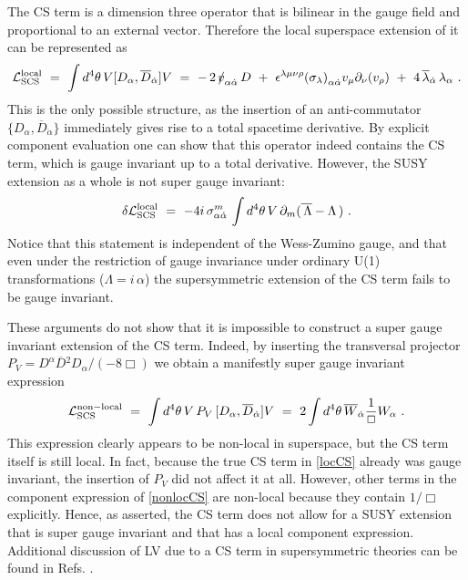 \documentclass[12pt]{revtex4}
\newcommand{\slashed}[1]{\hbox{{$#1$}\llap{$/$}}}
\begin{document}
The CS term is
a dimension three operator that is bilinear in the gauge field and
proportional to an external vector. 
Therefore the local superspace
extension of it can be represented as 
%
\begin{equation}
{\cal L}_{\rm SCS}^{\rm local} ~=~ \int d^4 \theta \, 
V [ D_\alpha, \overline{D}_{\dot\alpha}] V 
	~=~
	-\, 2\,\slashed{v}_{\alpha\dot{\alpha}}\, D
	~+~ 
	\epsilon^{\lambda\mu\nu\rho} 
	{(\sigma_{\lambda})}_{\alpha\dot{\alpha}} 
	v_\mu \partial_\nu ( v_\rho )
	~+~
	4\, \overline{\lambda}_{\dot{\alpha}}\, \lambda_\alpha ~. 
\label{locCS}
\end{equation} 
%
This is the only possible structure, as the insertion of an anti-commutator 
$\{D_\alpha, \overline{D}_{\dot\alpha}\}$ immediately gives rise to a total spacetime
derivative. By explicit component evaluation one can
show that this operator indeed contains the CS term, which 
is gauge invariant up to a total derivative. However, the
SUSY extension as a whole is not super gauge invariant: 
%
\begin{equation}
\delta {\cal L}_{\rm SCS}^{\rm local} 
~=~ - 4 i\, \sigma_{\alpha\dot{\alpha}}^m\, 
\int d^4 \theta \, 
V\, \partial_m ( \overline{\, \Lambda} - \Lambda \,)~. 
\label{locCStrans} 
\end{equation} 
%
Notice that this statement is independent of the Wess-Zumino
gauge, and that even under the restriction of  gauge invariance
under ordinary U(1) transformations 
($\Lambda = i \,\alpha$) the supersymmetric extension of the CS term
fails to be gauge invariant.  


These arguments do not show that it is impossible to construct a super
gauge invariant extension of the CS term. Indeed, by inserting the
transversal projector 
$P_V = D^\alpha \overline{D}{}^2 D_\alpha/(-8 \Box)$
we obtain a manifestly super gauge invariant expression 
%
\begin{equation}
\label{nonlocCS}
{\cal L}_{\rm SCS}^{\rm non-local} ~=~ \int d^4 \theta \, 
V\, P_V\,  [ D_\alpha, \overline{D}_{\dot\alpha}] V
~=~
2 \int d^4 \theta \, 
\overline{W}_{\dot\alpha} \frac 1{\Box} W_\alpha
~.
\end{equation} 
%
This expression clearly appears to be non-local in superspace, but
the CS term itself is still local. 
In fact, because the true CS term in \eqref{locCS} already was
gauge invariant, the insertion of $P_V$ did not affect it 
at all. 
However, other terms in the component expression of \eqref{nonlocCS} are
non-local because they contain $1/\Box$ explicitly. 
Hence, as
asserted, the CS term does not allow for a SUSY extension that is super
gauge invariant and that has a local component expression. 
Additional discussion of LV due to a CS term in supersymmetric theories 
can be found in Refs. \cite{Belich:,Belich:2005js}.
\end{document}
